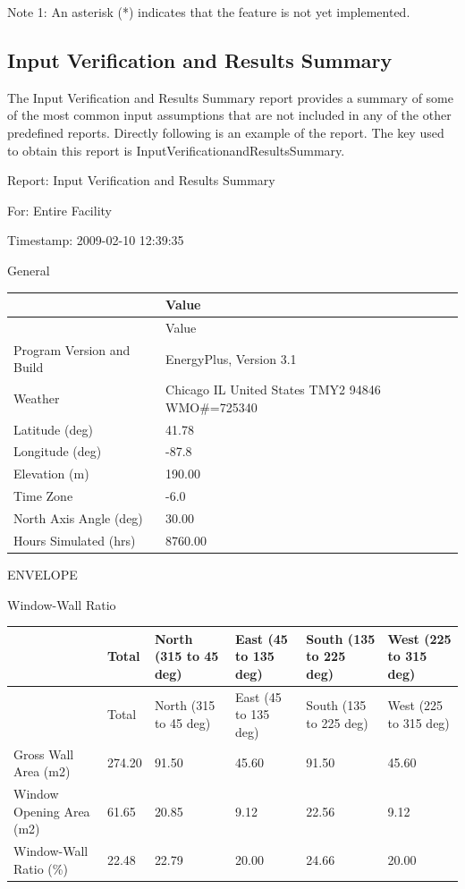 Note 1: An asterisk (*) indicates that the feature is not yet implemented.

\subsection{Input Verification and Results Summary}\label{input-verification-and-results-summary}

The Input Verification and Results Summary report provides a summary of some of the most common input assumptions that are not included in any of the other predefined reports. Directly following is an example of the report. The key used to obtain this report is InputVerificationandResultsSummary.

Report: Input Verification and Results Summary

For: Entire Facility

Timestamp: 2009-02-10 12:39:35

General

\begin{longtable}[c]{>{\raggedright}p{2.04in}>{\raggedright}p{3.94in}}
\toprule
~ & Value \tabularnewline
\midrule
\endfirsthead

\toprule
~ & Value \tabularnewline
\midrule
\endhead

Program Version and Build & EnergyPlus, Version 3.1 \tabularnewline
Weather & Chicago IL United States TMY2 94846 WMO\#=725340 \tabularnewline
Latitude (deg) & 41.78 \tabularnewline
Longitude (deg) & -87.8 \tabularnewline
Elevation (m) & 190.00 \tabularnewline
Time Zone & -6.0 \tabularnewline
North Axis Angle (deg) & 30.00 \tabularnewline
Hours Simulated (hrs) & 8760.00 \tabularnewline
\bottomrule
\end{longtable}

ENVELOPE

Window-Wall Ratio

\begin{longtable}[c]{>{\raggedright}p{1.0in}>{\raggedright}p{1.0in}>{\raggedright}p{1.0in}>{\raggedright}p{1.0in}>{\raggedright}p{1.0in}>{\raggedright}p{1.0in}}
\toprule
~ & Total & North (315 to 45 deg) & East (45 to 135 deg) & South (135 to 225 deg) & West (225 to 315 deg) \tabularnewline
\midrule
\endfirsthead

\toprule
~ & Total & North (315 to 45 deg) & East (45 to 135 deg) & South (135 to 225 deg) & West (225 to 315 deg) \tabularnewline
\midrule
\endhead

Gross Wall Area (m2) & 274.20 & 91.50 & 45.60 & 91.50 & 45.60 \tabularnewline
Window Opening Area (m2) & 61.65 & 20.85 & 9.12 & 22.56 & 9.12 \tabularnewline
Window-Wall Ratio (\%) & 22.48 & 22.79 & 20.00 & 24.66 & 20.00 \tabularnewline
\bottomrule
\end{longtable}

